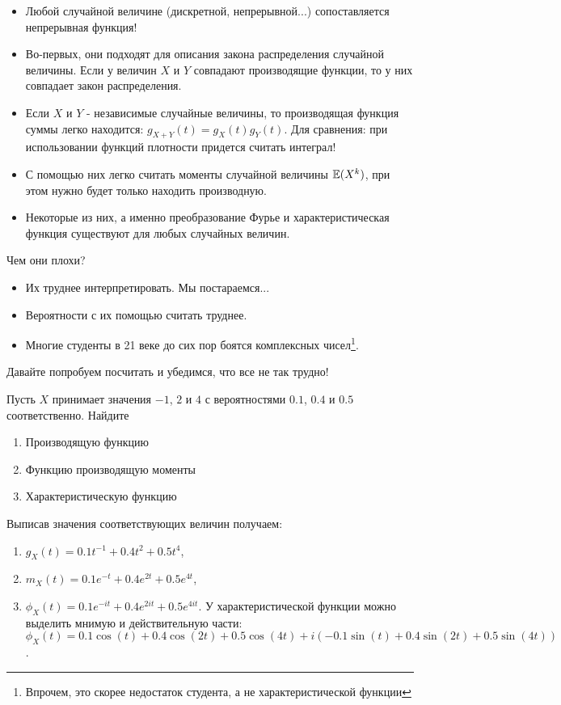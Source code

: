 {\begin{itemize}
\item Любой случайной величине (дискретной, непрерывной...) сопоставляется непрерывная функция!
\item Во-первых, они подходят для описания закона распределения случайной величины. Если у величин $X$ и $Y$ совпадают производящие функции, то у них совпадает закон распределения.
\item Если $X$ и $Y$ - независимые случайные величины, то производящая функция суммы легко находится: $g_{X+Y}(t)=g_{X}(t)g_{Y}(t)$. Для сравнения: при использовании функций плотности придется считать интеграл!
\item С помощью них легко считать моменты случайной величины $\mathbb{E}(X^{k})$, при этом нужно будет только находить производную.
\item Некоторые из них, а именно преобразование Фурье и характеристическая функция существуют для любых случайных величин.
\end{itemize}

Чем они плохи?
\begin{itemize}

\item Их труднее интерпретировать. Мы постараемся...
\item Вероятности с их помощью считать труднее.
\item Многие студенты в 21 веке до сих пор боятся комплексных чисел\footnote{Впрочем, это скорее недостаток студента, а не характеристической функции}.
\end{itemize}

Давайте попробуем посчитать и убедимся, что все не так трудно!
\begin{myex} Пусть $X$ принимает значения $-1$, $2$ и $4$ с вероятностями $0.1$, $0.4$ и $0.5$ соответственно. Найдите
\begin{enumerate}
\item Производящую функцию
\item Функцию производящую моменты
\item Характеристическую функцию
\end{enumerate}
Выписав значения соответствующих величин получаем:
\begin{enumerate}
\item $g_{X}(t)=0.1t^{-1}+0.4t^{2}+0.5t^{4}$,
\item $m_{X}(t)=0.1e^{-t}+0.4e^{2t}+0.5e^{4t}$,
\item $\phi_{X}(t)=0.1e^{-it}+0.4e^{2it}+0.5e^{4it}$. У характеристической функции можно выделить мнимую и действительную части: $\phi_{X}(t)=0.1\cos(t)+0.4\cos(2t)+0.5\cos(4t)+i(-0.1\sin(t)+0.4\sin(2t)+0.5\sin(4t))$.
\end{enumerate}


\end{myex}}
